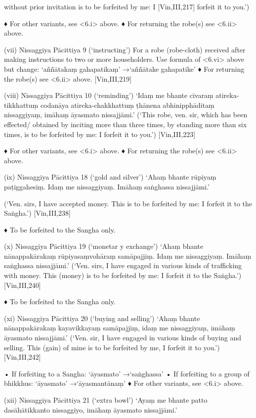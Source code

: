 without prior invitation is to be forfeited by me: I
[Vin,III,217]
forfeit it to you.’)

♦ For other variants, see <6.i> above.
♦ For returning the robe(s) see <6.ii> above.

(vii) Nissaggiya Pācittiya 9 (‘instructing’)
For a robe (robe-cloth) received after making
instructions to two or more householders. Use
formula of <6.vi> above but change:
‘aññātakaṃ gahapatikaṃ’
→‘aññātake gahapatike’
♦ For returning the robe(s) see <6.ii> above.
[Vin,III,219]

(viii) Nissaggiya Pācittiya 10 (‘reminding’)
‘Idaṃ me bhante cīvaraṃ atireka-tikkhattuṃ
codanāya atireka-chakkhattuṃ ṭhānena
abhinipphāditaṃ nissaggiyaṃ,
imāhaṃ āyasmato nissajjāmi.’
(‘This robe, ven. sir, which has been effected/
obtained by inciting more than three times, by
standing more than six times, is to be forfeited
by me: I forfeit it to you.’)
[Vin,III,223]

♦ For other variants, see <6.i> above.
♦ For returning the robe(s) see <6.ii> above.

(ix) Nissaggiya Pācittiya 18 (‘gold and silver’)
‘Ahaṃ bhante rūpiyaṃ paṭiggahesiṃ.
Idaṃ me nissaggiyaṃ.
Imāhaṃ saṅghassa nissajjāmi.’

(‘Ven. sirs, I have accepted money. This is to be
forfeited by me: I forfeit it to the Saṅgha.’)
[Vin,III,238]

♦ To be forfeited to the Sangha only.

(x) Nissaggiya Pācittiya 19 (‘monetar y exchange’)
‘Ahaṃ bhante nānappakārakaṃ rūpiyasaṃvohāraṃ samāpajjiṃ. Idaṃ me
nissaggiyaṃ. Imāhaṃ saṅghassa nissajjāmi.’
(‘Ven. sirs, I have engaged in various kinds of
trafficking with money. This (money) is to be
forfeited by me: I forfeit it to the Saṅgha.’)
[Vin,III,240]

♦ To be forfeited to the Sangha only.

(xi) Nissaggiya Pācittiya 20 (‘buying and selling’)
‘Ahaṃ bhante nānappakārakaṃ
kayavikkayaṃ samāpajjiṃ, idaṃ me
nissaggiyaṃ, imāhaṃ āyasmato nissajjāmi.’
(‘Ven. sir, I have engaged in various kinds of buying
and selling. This (gain) of mine is to be forfeited by
me, I forfeit it to you.’)
[Vin,III,242]

• If forfeiting to a Sangha:
‘āyasmato’ →‘saṅghassa’
• If forfeiting to a group of bhikkhus:
‘āyasmato’ →‘āyasmantānaṃ’
♦ For other variants, see <6.i> above.

(xii) Nissaggiya Pācittiya 21 (‘extra bowl’)
‘Ayaṃ me bhante patto dasāhātikkanto
nissaggiyo, imāhaṃ āyasmato nissajjāmi.’

